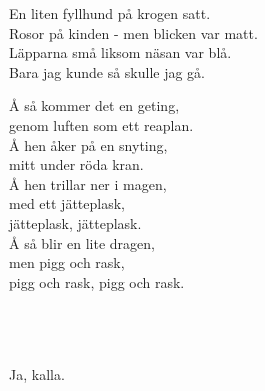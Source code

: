 \documentclass[a6paper, 10pt, twoside]{article}
\begin{document}
\vspace{20pt}
\begin{center}
\end{center}
\begin{lyrics}
En liten fyllhund på krogen satt. \\
Rosor på kinden - men blicken var matt. \\
Läpparna små liksom näsan var blå. \\
Bara jag kunde så skulle jag gå. 
\end{lyrics}
\vspace{20pt}
\begin{center}
\end{center}
\begin{lyrics}
Å så kommer det en geting, \\
genom luften som ett reaplan. \\
Å hen åker på en snyting, \\
mitt under röda kran. \\
Å hen trillar ner i magen, \\
med ett jätteplask, \\
jätteplask, jätteplask. \\
Å så blir en lite dragen, \\
men pigg och rask, \\
pigg och rask, pigg och rask. 
\end{lyrics}

\newpage
\noindent
\begin{center}
\end{center}
\begin{lyrics}
 \\
 \\
 \\
Ja, kalla. \\
\end{lyrics}
\end{document}
